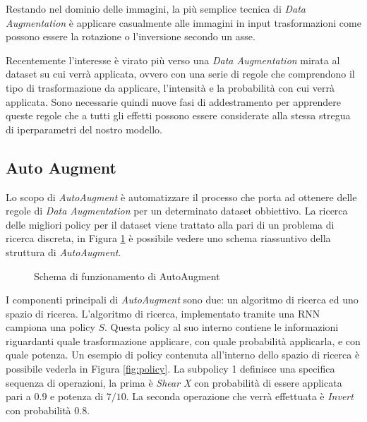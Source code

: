 Restando nel dominio delle immagini, la più semplice tecnica di \textit{Data Augmentation} è applicare casualmente alle immagini in input trasformazioni come possono essere la rotazione o l'inversione secondo un asse. 

Recentemente l'interesse è virato più verso una \textit{Data Augmentation} mirata al dataset su cui verrà applicata, ovvero con una serie di regole che comprendono il tipo di trasformazione da applicare, l'intensità e la probabilità con cui verrà applicata. Sono necessarie quindi nuove fasi di addestramento per apprendere queste regole che a tutti gli effetti possono essere considerate alla stessa stregua di iperparametri del nostro modello.
\subsection{Auto Augment}
\label{subsec:auto_augment}
Lo scopo di \textit{AutoAugment} \cite{DBLP:journals/corr/abs-1805-09501} è automatizzare il processo che porta ad ottenere delle regole di \textit{Data Augmentation} per un determinato dataset obbiettivo. La ricerca delle migliori policy per il dataset viene trattato alla pari di un problema di ricerca discreta, in Figura \ref{fig:AutoAugment} è possibile vedere uno schema riassuntivo della struttura di \textit{AutoAugment}.
\begin{figure}
    \centering
    \caption{Schema di funzionamento di AutoAugment}
    \label{fig:AutoAugment}
\end{figure}
I componenti principali di \textit{AutoAugment} sono due: un algoritmo di ricerca ed uno spazio di ricerca. 
L'algoritmo di ricerca, implementato tramite una \ac{RNN} campiona una policy $S$. Questa policy al suo interno contiene le informazioni riguardanti quale trasformazione applicare, con quale probabilità applicarla, e con quale potenza. Un esempio di policy contenuta all'interno dello spazio di ricerca è possibile vederla in Figura \ref{fig:policy}. La subpolicy 1 definisce una specifica sequenza di operazioni, la prima è \textit{Shear X} con probabilità di essere applicata pari a $0.9$ e potenza di $7/10$. La seconda operazione che verrà effettuata è \textit{Invert} con probabilità $0.8$. 
